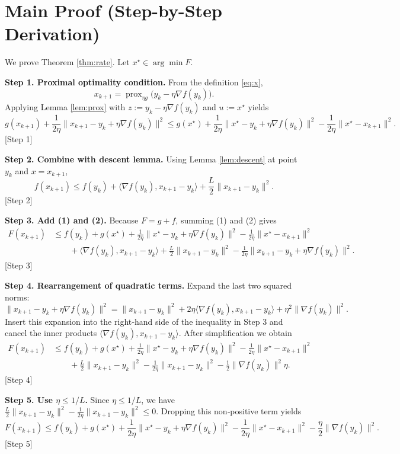 \documentclass{article}
\newcommand{\prox}{\operatorname{prox}}
\begin{document}
\section*{Main Proof (Step-by-Step Derivation)}
We prove Theorem \ref{thm:rate}. Let $x^\star\in\arg\min F$.

\noindent\textbf{Step 1.  Proximal optimality condition.}  
From the definition \eqref{eq:x},
\[
x_{k+1}= \prox_{\eta g}\bigl(y_k-\eta\nabla f(y_k)\bigr).
\]
Applying Lemma \ref{lem:prox} with $z:=y_k-\eta\nabla f(y_k)$ and $u:=x^\star$ yields
\[
g(x_{k+1})+\frac{1}{2\eta}\|x_{k+1}-y_k+\eta\nabla f(y_k)\|^{2}
\le g(x^\star)+\frac{1}{2\eta}\|x^\star-y_k+\eta\nabla f(y_k)\|^{2}
-\frac{1}{2\eta}\|x^\star-x_{k+1}\|^{2}. \tag{1}
\] 
[Step 1]

\noindent\textbf{Step 2.  Combine with descent lemma.}  
Using Lemma \ref{lem:descent} at point $y_k$ and $x=x_{k+1}$,
\[
f(x_{k+1})\le f(y_k)+\langle\nabla f(y_k),x_{k+1}-y_k\rangle+\frac{L}{2}\|x_{k+1}-y_k\|^{2}. \tag{2}
\] 
[Step 2]

\noindent\textbf{Step 3.  Add (1) and (2).}  
Because $F=g+f$, summing (1) and (2) gives
\[
\begin{aligned}
F(x_{k+1}) &\le f(y_k)+g(x^\star)+\frac{1}{2\eta}\|x^\star-y_k+\eta\nabla f(y_k)\|^{2}
               -\frac{1}{2\eta}\|x^\star-x_{k+1}\|^{2}\\
&\qquad +\langle\nabla f(y_k),x_{k+1}-y_k\rangle
          +\frac{L}{2}\|x_{k+1}-y_k\|^{2}
          -\frac{1}{2\eta}\|x_{k+1}-y_k+\eta\nabla f(y_k)\|^{2}.
\end{aligned}
\] 
[Step 3]

\noindent\textbf{Step 4.  Rearrangement of quadratic terms.}  
Expand the last two squared norms:
\[
\|x_{k+1}-y_k+\eta\nabla f(y_k)\|^{2}
= \|x_{k+1}-y_k\|^{2}+2\eta\langle\nabla f(y_k),x_{k+1}-y_k\rangle+\eta^{2}\|\nabla f(y_k)\|^{2}.
\]
Insert this expansion into the right‑hand side of the inequality in Step 3 and cancel the inner products $\langle\nabla f(y_k),x_{k+1}-y_k\rangle$. After simplification we obtain
\[
\begin{aligned}
F(x_{k+1}) &\le f(y_k)+g(x^\star)+\frac{1}{2\eta}\|x^\star-y_k+\eta\nabla f(y_k)\|^{2}
            -\frac{1}{2\eta}\|x^\star-x_{k+1}\|^{2}\\
&\qquad +\frac{L}{2}\|x_{k+1}-y_k\|^{2}
        -\frac{1}{2\eta}\|x_{k+1}-y_k\|^{2}
        -\frac{1}{2}\|\nabla f(y_k)\|^{2}\eta .
\end{aligned}
\] 
[Step 4]

\noindent\textbf{Step 5.  Use $\eta\le 1/L$.}  
Since $\eta\le 1/L$, we have $ \frac{L}{2}\|x_{k+1}-y_k\|^{2}
        -\frac{1}{2\eta}\|x_{k+1}-y_k\|^{2}\le 0$. Dropping this non‑positive term yields
\[
F(x_{k+1}) \le f(y_k)+g(x^\star)+\frac{1}{2\eta}\|x^\star-y_k+\eta\nabla f(y_k)\|^{2}
            -\frac{1}{2\eta}\|x^\star-x_{k+1}\|^{2}
            -\frac{\eta}{2}\|\nabla f(y_k)\|^{2}. \tag{3}
\] 
[Step 5]
\end{document}
